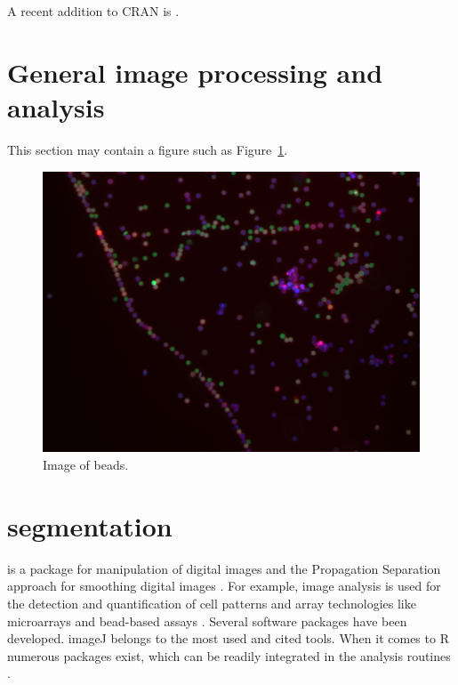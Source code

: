 A recent addition to CRAN is  \citep{barthelme_imager:_2016}.

\section{General image processing and analysis}

This section may contain a figure such as Figure~\ref{figure:bead}.

\begin{figure}[htbp]
  \centering
  \includegraphics[clip=true,trim=0.1cm 0.3cm 0.2cm 0.1cm, width=12cm]{bead}
  \caption{Image of beads.}
  \label{figure:bead}
\end{figure}

\section{segmentation}

\citep{holmes_interactive_2009}

 is a package for manipulation of digital images and the 
Propagation Separation approach for smoothing digital images \citep{polzehl_adaptive_2007}.
For example, image analysis is used for the detection and quantification of 
cell patterns and array technologies like microarrays and bead-based assays 
\citep{rodiger_highly_2013, willitzki_new_2012, willitzki_fully_2013, 
dunning_beadarray:_2006}.
Several software packages have been developed. imageJ belongs to the most 
used and cited tools. When it comes to R numerous packages exist, which can 
be readily integrated in the analysis routines \citep{frery_introduction_2013}.

